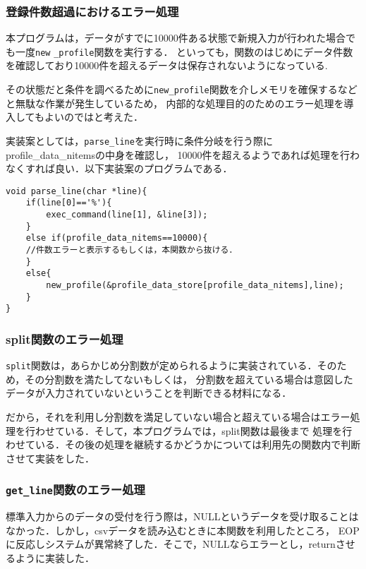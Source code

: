 \documentclass[a4j,11pt]{jarticle}
\begin{document}
\subsubsection{登録件数超過におけるエラー処理}
本プログラムは，データがすでに10000件ある状態で新規入力が行われた場合でも一度\verb|new| \verb|_profile|関数を実行する．
といっても，関数のはじめにデータ件数を確認しており10000件を超えるデータは保存されないようになっている.

その状態だと条件を調べるために\verb|new_profile|関数を介しメモリを確保するなどと無駄な作業が発生しているため，
内部的な処理目的のためのエラー処理を導入してもよいのではと考えた．

実装案としては，\verb|parse_line|を実行時に条件分岐を行う際にprofile\_data\_nitemsの中身を確認し，
10000件を超えるようであれば処理を行わなくすれば良い．以下実装案のプログラムである．
\begin{verbatim}
void parse_line(char *line){
    if(line[0]=='%'){
        exec_command(line[1], &line[3]);
    }
    else if(profile_data_nitems==10000){
    //件数エラーと表示するもしくは，本関数から抜ける．
    }
    else{
        new_profile(&profile_data_store[profile_data_nitems],line);
    }
}
\end{verbatim}
\subsubsection{split関数のエラー処理}
\verb|split|関数は，あらかじめ分割数が定められるように実装されている．そのため，その分割数を満たしてないもしくは，
分割数を超えている場合は意図したデータが入力されていないということを判断できる材料になる．

だから，それを利用し分割数を満足していない場合と超えている場合はエラー処理を行わせている．そして，本プログラムでは，split関数は最後まで
処理を行わせている．その後の処理を継続するかどうかについては利用先の関数内で判断させて実装をした．

\subsubsection{\texttt{get\_line}関数のエラー処理}
標準入力からのデータの受付を行う際は，NULLというデータを受け取ることはなかった．しかし，csvデータを読み込むときに本関数を利用したところ，
EOPに反応しシステムが異常終了した．そこで，NULLならエラーとし，returnさせるように実装した．
\end{document}
